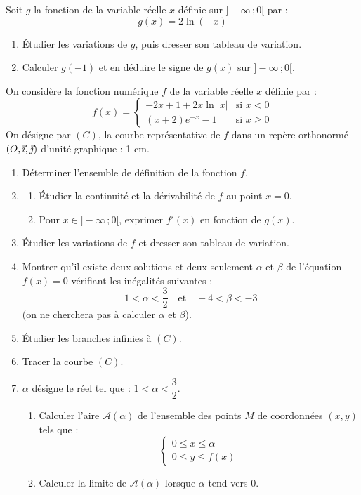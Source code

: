 \documentclass[11pt]{article}
\begin{document}

Soit $g$ la fonction de la variable réelle $x$ définie sur $]-\infty\,;0[$ par :
\[ g(x) = 2\ln(-x) \]

\begin{enumerate}
  \item Étudier les variations de $g$, puis dresser son tableau de variation.
  \item Calculer $g(-1)$ et en déduire le signe de $g(x)$ sur $]-\infty\,;0[$.
\end{enumerate}

On considère la fonction numérique $f$ de la variable réelle $x$ définie par :
\[ f(x) = \begin{cases} -2x + 1 + 2x\ln|x| & \text{si } x < 0 \\[0.5ex] (x+2)e^{-x} - 1 & \text{si } x \ge 0 \end{cases} \]
On désigne par $(C)$, la courbe représentative de $f$ dans un repère orthonormé $(O,\vec{\imath},\vec{\jmath})$ d'unité graphique : 1 cm.

\begin{enumerate}
  \item Déterminer l'ensemble de définition de la fonction $f$.
  \item \begin{enumerate}[label=\alph*.]
    \item Étudier la continuité et la dérivabilité de $f$ au point $x = 0$.
    \item Pour $x \in ]-\infty\,;0[$, exprimer $f'(x)$ en fonction de $g(x)$.
  \end{enumerate}
  \item Étudier les variations de $f$ et dresser son tableau de variation.
  \item Montrer qu'il existe deux solutions et deux seulement $\alpha$ et $\beta$ de l'équation $f(x) = 0$ vérifiant les inégalités suivantes :
  \[ 1 < \alpha < \dfrac{3}{2} \quad \text{et} \quad -4 < \beta < -3 \]
  (on ne cherchera pas à calculer $\alpha$ et $\beta$).
  \item Étudier les branches infinies à $(C)$.
  \item Tracer la courbe $(C)$.
  \item $\alpha$ désigne le réel tel que : $1 < \alpha < \dfrac{3}{2}$.
  \begin{enumerate}[label=\alph*.]
    \item Calculer l'aire $\mathcal{A}(\alpha)$ de l'ensemble des points $M$ de coordonnées $(x, y)$ tels que :
    \[ \begin{cases} 0 \le x \le \alpha \\ 0 \le y \le f(x) \end{cases} \]
    \item Calculer la limite de $\mathcal{A}(\alpha)$ lorsque $\alpha$ tend vers 0.
  \end{enumerate}
\end{enumerate}
\end{document}

